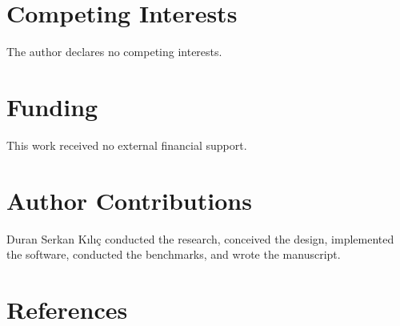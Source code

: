 \documentclass[fleqn,10pt]{wlpeerj}
\begin{document}
\section{Competing Interests}\label{competing-interests}

The author declares no competing interests.

\section{Funding}\label{funding}

This work received no external financial support.

\section{Author Contributions}\label{author-contributions}

Duran Serkan Kılıç conducted the research, conceived the design,
implemented the software, conducted the benchmarks, and wrote the
manuscript.

\newpage

\section*{References}\label{references}
\end{document}
